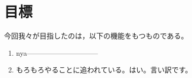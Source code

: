 \documentclass[report.tex]{subfiles}
\begin{document}
\section{目標}


今回我々が目指したのは，以下の機能をもつものである。
\begin{enumerate}
  \item nya------------------------------
  \item もろもろやることに追われている。はい。言い訳です。
\end{enumerate}
\end{document}
